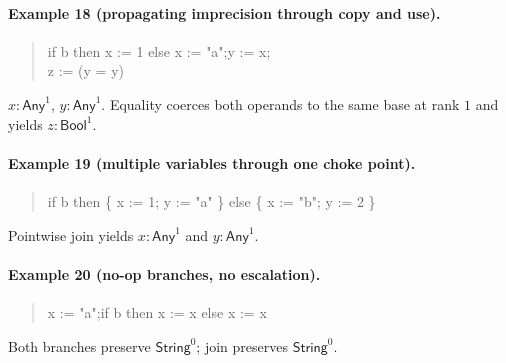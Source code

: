 \paragraph{Example 18 (propagating imprecision through copy and use).}
\begin{quote}\ttfamily
if b then x := 1 else x := "a";\quad y := x;\\
z := (y = y)
\end{quote}
$x:\textsf{Any}^{1}$, $y:\textsf{Any}^{1}$.  
Equality coerces both operands to the same base at rank $1$ and yields $z:\textsf{Bool}^{1}$.

\paragraph{Example 19 (multiple variables through one choke point).}
\begin{quote}\ttfamily
if b then \{ x := 1; y := "a" \} else \{ x := "b"; y := 2 \}
\end{quote}
Pointwise join yields $x:\textsf{Any}^{1}$ and $y:\textsf{Any}^{1}$.

\paragraph{Example 20 (no-op branches, no escalation).}
\begin{quote}\ttfamily
x := "a";\quad if b then x := x else x := x
\end{quote}
Both branches preserve $\textsf{String}^{0}$; join preserves $\textsf{String}^{0}$.
